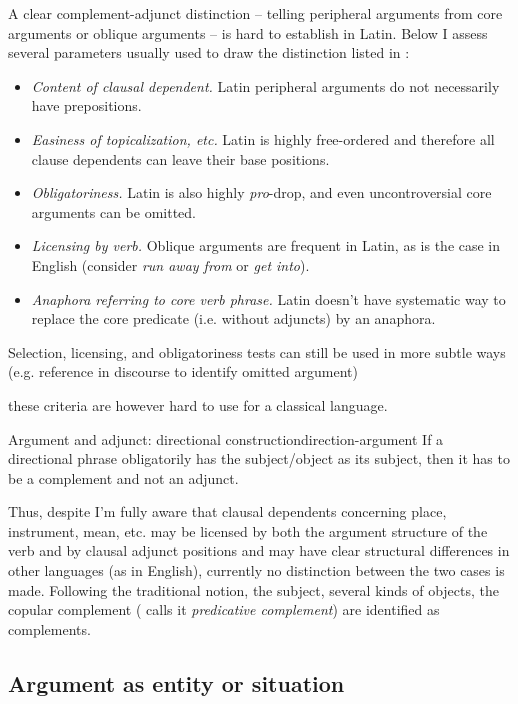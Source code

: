 \documentclass[a4paper, oneside, 12pt]{report}
\newcommand*{\citesec}[1]{\S~{#1}}
\newcommand*{\term}[1]{\emph{#1}}
\newcommand{\form}[1]{\emph{#1}}
\begin{document}
A clear complement-adjunct distinction 
-- telling peripheral arguments from core arguments or oblique arguments --
is hard to establish in Latin.
Below I assess several parameters usually used to draw the distinction
listed in \citet[\citesec{4.1.2}]{cgel}:
\begin{itemize}
    \item \emph{Content of clausal dependent.} Latin peripheral arguments do not necessarily have prepositions.
    \item \emph{Easiness of topicalization, etc.} Latin is highly free-ordered and therefore all clause dependents 
    can leave their base positions.
    \item \emph{Obligatoriness.} Latin is also highly \term{pro}-drop,
    and even uncontroversial core arguments can be omitted.
    \item \emph{Licensing by verb.} Oblique arguments are frequent in Latin,
    as is the case in English 
    (consider \form{run away from} or \form{get into}).
    \item \emph{Anaphora referring to core verb phrase.} Latin doesn't have systematic way to replace the core predicate (i.e. without adjuncts) by an anaphora.
\end{itemize}
Selection, licensing, and obligatoriness tests 
can still be used in more subtle ways
(e.g. reference in discourse to identify omitted argument)

these criteria are however hard to use for a classical language. 

\begin{todobox}{Argument and adjunct: directional construction}{direction-argument}
    If a directional phrase obligatorily has the subject/object as its subject,
    then it has to be a complement and not an adjunct.

    Thus, despite I'm fully aware that  
    clausal dependents concerning place, instrument, mean, etc. 
    may be licensed by both the argument structure of the verb 
    and by clausal adjunct positions 
    and may have clear structural differences in other languages 
    (as in English), 
    currently no distinction between the two cases is made.
    Following the traditional notion,
    the subject, several kinds of objects,
    the copular complement (\citet{cgel} calls it \term{predicative complement}) 
    are identified as complements.
\end{todobox}

\subsection{Argument as entity or situation}\label{sec:verb-phrase.arguments.compatibility}
\end{document}
